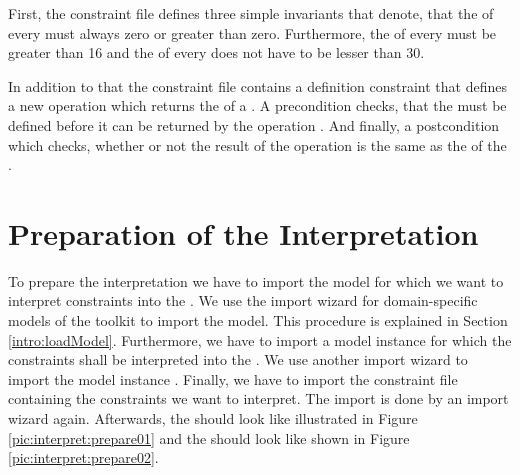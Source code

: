 First, the constraint file defines three simple invariants that denote, that the  of every  must always zero or greater than zero. Furthermore, the  of every  must be greater than 16 and the   of every  does not have to be lesser than 30.

In addition to that the constraint file contains a definition constraint that defines a new operation  which returns the  of a . A precondition checks, that the  must be defined before it can be returned by the operation . And finally, a postcondition which checks, whether or not the result of the operation  is the same as the  of the .



\section{Preparation of the Interpretation}

To prepare the interpretation we have to import the model  for which we want to interpret constraints into the . We use the import wizard for domain-specific models of the toolkit to import the model. This procedure is explained in Section \ref{intro:loadModel}. Furthermore, we have to import a model instance for which the constraints shall be interpreted into the . We use another import wizard to import the model instance . Finally, we have to import the constraint file  containing the constraints we want to interpret. The import is done by an import wizard again. Afterwards, the  should look like illustrated in Figure \ref{pic:interpret:prepare01} and the  should look like shown in Figure \ref{pic:interpret:prepare02}.

